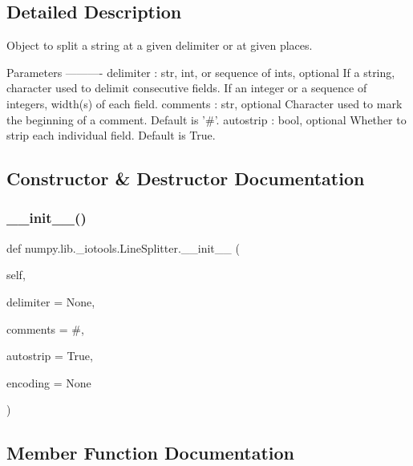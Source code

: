 \subsection{Detailed Description}
\begin{DoxyVerb}Object to split a string at a given delimiter or at given places.

Parameters
----------
delimiter : str, int, or sequence of ints, optional
    If a string, character used to delimit consecutive fields.
    If an integer or a sequence of integers, width(s) of each field.
comments : str, optional
    Character used to mark the beginning of a comment. Default is '#'.
autostrip : bool, optional
    Whether to strip each individual field. Default is True.\end{DoxyVerb}
 

\subsection{Constructor \& Destructor Documentation}
\mbox{\label{classnumpy_1_1lib_1_1__iotools_1_1LineSplitter_a2a1b4ab86f147d894ab93fa8dc2d8eae}} 
\subsubsection{\texorpdfstring{\+\_\+\+\_\+init\+\_\+\+\_\+()}{\_\_init\_\_()}}
{\footnotesize\ttfamily def numpy.\+lib.\+\_\+iotools.\+Line\+Splitter.\+\_\+\+\_\+init\+\_\+\+\_\+ (\begin{DoxyParamCaption}\item[{}]{self,  }\item[{}]{delimiter = {\ttfamily None},  }\item[{}]{comments = {\ttfamily \textquotesingle{}\#\textquotesingle{}},  }\item[{}]{autostrip = {\ttfamily True},  }\item[{}]{encoding = {\ttfamily None} }\end{DoxyParamCaption})}



\subsection{Member Function Documentation}
\mbox{\label{classnumpy_1_1lib_1_1__iotools_1_1LineSplitter_afb031e5ebdbe5dc2767872c029d2b1b5}} 
